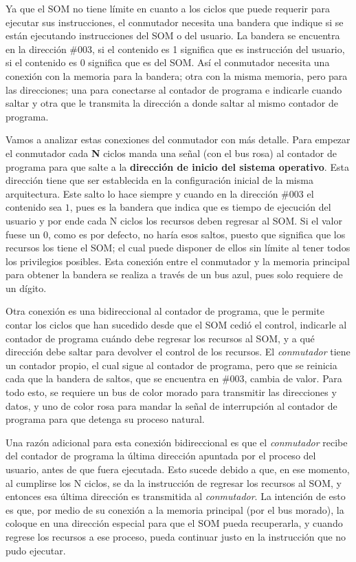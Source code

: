 \documentclass[letterpaper,12pt,oneside]{book}
\begin{document}
		Ya que el SOM no tiene límite en cuanto a los
		ciclos que puede requerir para ejecutar sus instrucciones, el conmutador necesita una bandera que indique si se están
		ejecutando instrucciones del SOM o del usuario. La bandera se encuentra en la dirección \#003, si el contenido es 1 significa que es instrucción
		del usuario, si el contenido es 0 significa que es del SOM. Así el conmutador necesita una conexión con la memoria para la bandera;
		otra con la misma memoria, pero para las direcciones; una para conectarse al contador de programa e indicarle cuando saltar y otra
		que le transmita la dirección a donde saltar al mismo contador de programa.
		
		
		Vamos a analizar estas conexiones del conmutador con más detalle. Para empezar 
		el conmutador cada \textbf{N} ciclos manda una señal (con el bus rosa) al contador de programa para que salte a la \textbf{dirección 
		de inicio del sistema operativo}. Esta dirección tiene que ser establecida en la configuración inicial de la misma arquitectura. Este salto lo hace siempre y cuando en la dirección
		\#003 el contenido sea $1$, pues es la bandera que indica que es tiempo de ejecución del usuario y por ende cada N ciclos los recursos 
		deben regresar al SOM. Si
		el valor fuese un $0$, como es por defecto, no haría esos saltos, puesto que significa que los recursos los tiene el SOM; el cual puede disponer
		de ellos sin límite al tener todos los privilegios posibles. Esta conexión entre el conmutador y la memoria principal para
		obtener la bandera se realiza a través de un 
		bus azul, pues solo requiere de un dígito.
  
        Otra conexión es una bidireccional al contador de programa, que le permite contar los ciclos que han sucedido desde que el SOM cedió el control, indicarle al contador de programa cuándo debe regresar los recursos al SOM, y a qué dirección
		debe saltar para devolver el control de los recursos. El \textit{conmutador} tiene un contador propio, el cual sigue al contador de programa, pero que se reinicia cada que la bandera de saltos, que se encuentra en \#003, cambia de valor.
        Para todo esto, se requiere un bus de color morado para transmitir las direcciones y datos, y uno de color rosa para mandar la señal
        de interrupción al contador de programa para que detenga su proceso natural.
  
        Una razón adicional para esta conexión bidireccional es que el \textit{conmutador} recibe del contador de programa la última dirección
		apuntada por el proceso del usuario, antes de que fuera ejecutada. Esto sucede debido a que, en ese momento, al cumplirse los N ciclos, se da la instrucción de regresar los recursos al SOM, y entonces esa última dirección es transmitida al \textit{conmutador}. La intención de esto es que, por medio de su conexión a la memoria principal (por el bus morado),
		la coloque en una dirección especial para que el SOM pueda recuperarla, y cuando regrese los recursos a ese proceso, pueda continuar
		justo en la instrucción que no pudo ejecutar.
		
\end{document}
